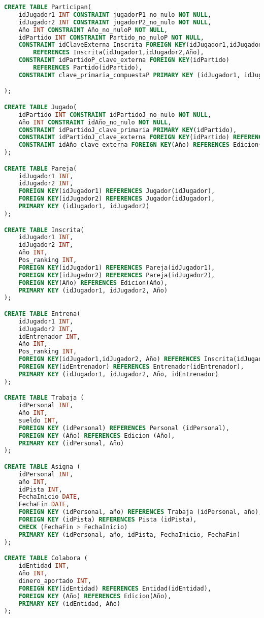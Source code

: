 \begin{lstlisting}[language=sql]
CREATE TABLE Participan(
	idJugador1 INT CONSTRAINT jugadorP1_no_nulo NOT NULL,
	idJugador2 INT CONSTRAINT jugadorP2_no_nulo NOT NULL,
	Año INT CONSTRAINT Año_no_nuloP NOT NULL,
	idPartido INT CONSTRAINT Partido_no_nuloP NOT NULL,
	CONSTRAINT idClaveExterna_Inscrita FOREIGN KEY(idJugador1,idJugador2,Año)
		REFERENCES Inscrita(idJugador1,idJugador2,Año),
	CONSTRAINT idPartidoP_clave_externa FOREIGN KEY(idPartido)
		REFERENCES Partido(idPartido),
	CONSTRAINT clave_primaria_compuestaP PRIMARY KEY (idJugador1, idJugador2, Año,idPartido)

);

CREATE TABLE Jugado(
	idPartido INT CONSTRAINT idPartidoJ_no_nulo NOT NULL,
	Año INT CONSTRAINT idAño_no_nulo NOT NULL,
	CONSTRAINT idPartidoJ_clave_primaria PRIMARY KEY(idPartido),
	CONSTRAINT idPartidoJ_clave_externa FOREIGN KEY(idPartido) REFERENCES Partido(idPartido),
	CONSTRAINT idAño_clave_externa FOREIGN KEY(Año) REFERENCES Edicion(Año)
);

CREATE TABLE Pareja(
	idJugador1 INT,
	idJugador2 INT,
	FOREIGN KEY(idJugador1) REFERENCES Jugador(idJugador),
	FOREIGN KEY(idJugador2) REFERENCES Jugador(idJugador),
	PRIMARY KEY (idJugador1, idJugador2)
);

CREATE TABLE Inscrita(
	idJugador1 INT,
	idJugador2 INT,
	Año INT,
	Pos_ranking INT,
	FOREIGN KEY(idJugador1) REFERENCES Pareja(idJugador1),
	FOREIGN KEY(idJugador2) REFERENCES Pareja(idJugador2),
	FOREIGN KEY(Año) REFERENCES Edicion(Año),
	PRIMARY KEY (idJugador1, idJugador2, Año)
);

CREATE TABLE Entrena(
	idJugador1 INT,
	idJugador2 INT,
	idEntrenador INT,
	Año INT,
	Pos_ranking INT,
	FOREIGN KEY(idJugador1,idJugador2, Año) REFERENCES Inscrita(idJugador1,idJugador2, Año),
	FOREIGN KEY(idEntrenador) REFERENCES Entrenador(idEntrenador),
	PRIMARY KEY (idJugador1, idJugador2, Año, idEntrenador)
);

CREATE TABLE Trabaja (
	idPersonal INT,
	Año INT,
	sueldo INT,
	FOREIGN KEY (idPersonal) REFERENCES Personal (idPersonal),
	FOREIGN KEY (Año) REFERENCES Edicion (Año),
	PRIMARY KEY (idPersonal, Año)
);

CREATE TABLE Asigna (
	idPersonal INT,
	año INT,
	idPista INT,
	FechaInicio DATE,
	FechaFin DATE,
	FOREIGN KEY (idPersonal, año) REFERENCES Trabaja (idPersonal, año),
	FOREIGN KEY (idPista) REFERENCES Pista (idPista),
	CHECK (FechaFin > FechaInicio)
	PRIMARY KEY (idPersonal, año, idPista, FechaInicio, FechaFin)
);

CREATE TABLE Colabora (
	idEntidad INT,
	Año INT,
	dinero_aportado INT,
	FOREIGN KEY(idEntidad) REFERENCES Entidad(idEntidad),
	FOREIGN KEY (Año) REFERENCES Edicion(Año),
	PRIMARY KEY (idEntidad, Año)
);


\end{lstlisting}
